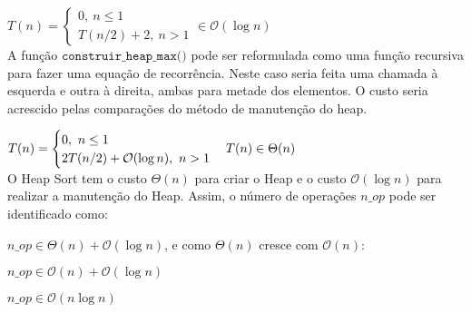 \documentclass[a4paper, twocolumn]{article}
\theoremstyle{definition}
\begin{document}
$T(n) = \begin{cases} 
	0, \ n \leq 1\\
	T(n/2) + 2, \ n > 1
\end{cases} \in \mathcal{O}(\log n)$ \\

A função $\texttt{construir\_heap\_max()}$ pode ser reformulada como uma função recursiva para fazer uma equação de recorrência. Neste caso seria feita uma chamada à esquerda e outra à direita, ambas para metade dos elementos. O custo seria acrescido pelas comparações do método de manutenção do heap.

$T(n) = \begin{cases} 
	0, \ n \leq 1\\
	2T(n/2) + \mathcal{O}(\log n), \ n > 1
\end{cases} \\ T(n) \in \Theta(n)$ \\

O Heap Sort tem o custo $\Theta(n)$ para criar o Heap e o custo $\mathcal{O}(\log n)$ para realizar a manutenção do Heap. Assim, o número de operações $n\_op$ pode ser identificado como:

$n\_op \in \Theta(n) + \mathcal{O}(\log n)$, e como $\Theta(n)$ cresce com $\mathcal{O}(n)$:

$n\_op \in \mathcal{O}(n) + \mathcal{O}(\log n)$

$n\_op \in \mathcal{O}(n \log n)$
\end{document}
